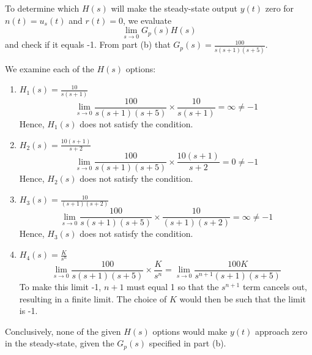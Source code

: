 \documentclass{article}
\begin{document}
To determine which \( H(s) \) will make the steady-state output \( y(t) \) zero for \( n(t) = u_s(t) \) and \( r(t) = 0 \), we evaluate \[ \lim_{{s \to 0}} G_p(s)H(s) \] and check if it equals -1. From part (b) that \( G_p(s) = \frac{100}{s(s+1)(s+5)} \).

We examine each of the \( H(s) \) options:

\begin{enumerate}
    \item \( H_1(s) = \frac{10}{s(s+1)} \)
    \[ \lim_{{s \to 0}} \frac{100}{s(s+1)(s+5)} \times \frac{10}{s(s+1)} = \infty \neq -1 \]
    Hence, \( H_1(s) \) does not satisfy the condition.

    \item \( H_2(s) = \frac{10(s+1)}{s+2} \)
    \[ \lim_{{s \to 0}} \frac{100}{s(s+1)(s+5)} \times \frac{10(s+1)}{s+2} = 0 \neq -1 \]
    Hence, \( H_2(s) \) does not satisfy the condition.

    \item \( H_3(s) = \frac{10}{(s+1)(s+2)} \)
    \[ \lim_{{s \to 0}} \frac{100}{s(s+1)(s+5)} \times \frac{10}{(s+1)(s+2)} = \infty \neq -1 \]
    Hence, \( H_3(s) \) does not satisfy the condition.

    \item \( H_4(s) = \frac{K}{s^n} \)
    \[ \lim_{{s \to 0}} \frac{100}{s(s+1)(s+5)} \times \frac{K}{s^n} = \lim_{{s \to 0}} \frac{100K}{s^{n+1}(s+1)(s+5)} \]
    To make this limit -1, \( n+1 \) must equal 1 so that the \( s^{n+1} \) term cancels out, resulting in a finite limit. The choice of \( K \) would then be such that the limit is -1.
\end{enumerate}

Conclusively, none of the given \( H(s) \) options would make \( y(t) \) approach zero in the steady-state, given the \( G_p(s) \) specified in part (b).
\end{document}
